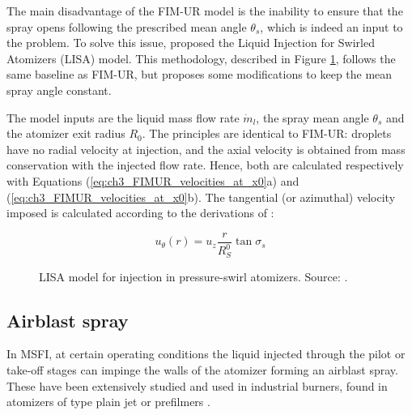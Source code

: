 The main disadvantage of the FIM-UR model is the inability to ensure that the spray opens following the prescribed mean angle $\theta_s$, which is indeed an input to the problem. To solve this issue,  proposed the Liquid Injection for Swirled Atomizers (LISA) model. This methodology, described in Figure \ref{fig:LISA_methodology}, follows the same baseline as FIM-UR, but proposes some modifications to keep the mean spray angle constant.

The model inputs are the liquid mass flow rate $\dot{m}_l$, the spray mean angle $\theta_s$ and the atomizer exit radius $R_0$. The principles are identical to FIM-UR: droplets have no radial velocity at injection, and the axial velocity is obtained from mass conservation with the injected flow rate. Hence, both are calculated respectively with Equations (\ref{eq:ch3_FIMUR_velocities_at_x0}a) and (\ref{eq:ch3_FIMUR_velocities_at_x0}b). The tangential (or azimuthal) velocity imposed is calculated according to the derivations of :

\begin{equation}
\label{eq:LISA_model_u_theta}
u_\theta \left( r \right) = u_z  \frac{r}{R_S^0} \tan \sigma_s
\end{equation}


\begin{figure}[ht]
    \centering
       \centering
    \caption{LISA model for injection in pressure-swirl atomizers. Source: .}
    \label{fig:LISA_methodology}
\end{figure}




\subsection{Airblast spray}

In MSFI, at certain operating conditions the liquid injected through the pilot or take-off stages can impinge the walls of the atomizer forming an airblast spray. These have been extensively studied  and used in industrial burners, found in atomizers of type plain jet or prefilmers .

